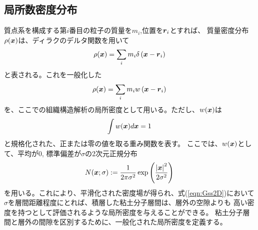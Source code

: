\subsection{局所数密度分布}
質点系を構成する第$i$番目の粒子の質量を$m_i$,位置を$\mbox{\boldmath $r$}_i$とすれば、
質量密度分布$\rho(\mbox{\boldmath $x$})$は、ディラクのデルタ関数を用いて
\begin{equation}
	\rho(\mbox{\boldmath $x$})=\sum_{i} m_i\delta\left(\mbox{\boldmath $x$}-\mbox{\boldmath $r$}_i\right)
\end{equation}
と表される。これを一般化した
\begin{equation}
	\rho(\mbox{\boldmath $x$})=\sum_{i} m_i w\left(\mbox{\boldmath $x$}-\mbox{\boldmath $r$}_i\right)
\end{equation}
を、ここでの組織構造解析の局所密度として用いる。ただし、$w(\mbox{\boldmath $x$})$は
\begin{equation}
	\int w(\mbox{\boldmath $x$}) d\mbox{\boldmath $x$} =1
\end{equation}
と規格化された、正または零の値を取る重み関数を表す。
ここでは、$w(\mbox{\boldmath $x$})$として、平均が0, 標準偏差が$\sigma$の2次元正規分布
\begin{equation}
	N(\mbox{\boldmath $x$};\sigma):=
	\frac{1}{2\pi\sigma^2}
	\exp\left(
		\frac{\left|\mbox{\boldmath $x$}\right|^2}{2\sigma^2}
	\right)
	\label{eqn:Gss2D}
\end{equation}
を用いる。これにより、平滑化された密度場が得られ、式(\ref{eqn:Gss2D})において
$\sigma$を層間距離程度にとれば、積層した粘土分子層間は、層外の空隙よりも
高い密度を持つとして評価されるような局所密度を与えることができる。
粘土分子層間と層外の間隙を区別するために、一般化された局所密度を定義する。
